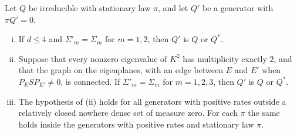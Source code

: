 \begin{theorem}\label{thm:second-moments}
Let $Q$ be irreducible with stationary law $\pi$, and let $Q'$ be a generator with $\pi Q'=0$.
\begin{enumerate}[(i)]
\item If $d\le4$ and $\Sigma'_m=\Sigma_m$ for $m=1,2$, then $Q'$ is $Q$ or $Q^*$.
\item Suppose that every nonzero eigenvalue of $K^2$ has multiplicity exactly $2$, and that the
graph on the eigenplanes, with an edge between $E$ and $E'$ when $P_ESP_{E'}\ne0$, is connected.
If $\Sigma'_m=\Sigma_m$ for $m=1,2,3$, then $Q'$ is $Q$ or $Q^*$.
\item The hypothesis of \textup{(ii)} holds for all generators with positive rates outside a
relatively closed nowhere dense set of measure zero. For each $\pi$ the same holds inside the
generators with positive rates and stationary law $\pi$.
\end{enumerate}
\end{theorem}

